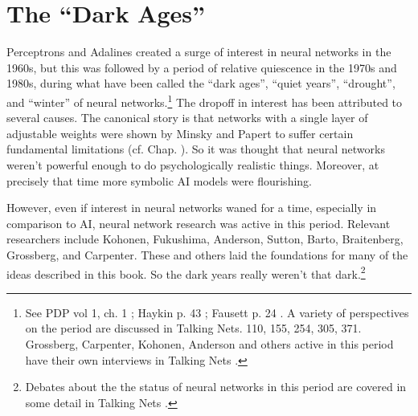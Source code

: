 \section{The ``Dark Ages''}\label{dark_ages}


Perceptrons and Adalines created a surge of interest in neural networks in the 1960s, but this was followed by a period of relative quiescence in the 1970s and 1980s, during what have been called the ``dark ages'', ``quiet years'', ``drought'', and ``winter'' of neural networks.\footnote{See PDP vol 1, ch. 1 \cite{rumelhart1986parallel}; Haykin p. 43 \cite{haykin1998neural}; Fausett p. 24 \cite{fausett1994fundamentals}. A variety of perspectives on the period are discussed in Talking Nets. 110, 155, 254, 305, 371. Grossberg, Carpenter, Kohonen, Anderson and others active in this period have their own interviews in Talking Nets \cite{anderson2000talking}.}  The dropoff in interest has been attributed to several causes. The canonical story is that networks with a single layer of adjustable weights were shown by Minsky and Papert to suffer certain fundamental limitations \cite{minsky1969perceptrons} (cf. Chap. ). So it was thought that neural networks weren't powerful enough to do psychologically realistic things. Moreover, at precisely that time more symbolic AI models were flourishing. 

However, even if interest in neural networks waned for a time, especially in comparison to AI, neural network research was active in this period. Relevant researchers include Kohonen, Fukushima, Anderson, Sutton, Barto, Braitenberg, Grossberg, and Carpenter. These and others laid the foundations for many of the ideas described in this book. So the dark years really weren't that dark.\footnote{Debates about the the status of neural networks in this period are covered in some detail in Talking Nets \cite{anderson2000talking}.} 

